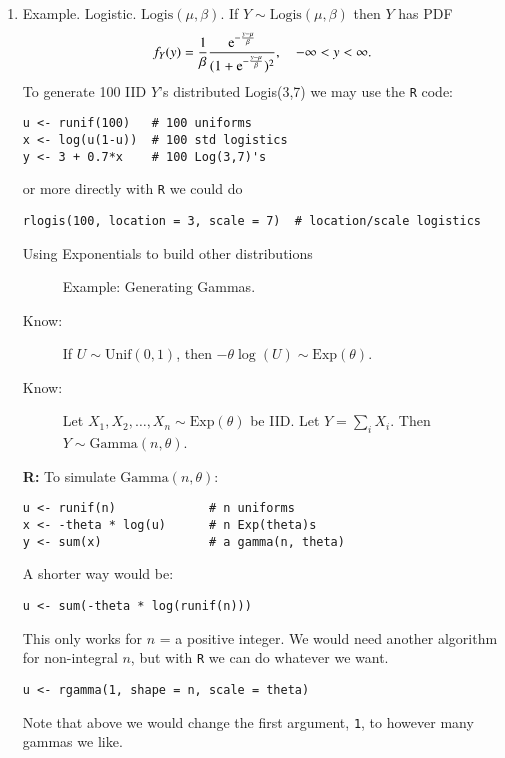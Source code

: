 \documentclass[11pt,english]{scrbook}
\begin{document}
\begin{enumerate}
\item Example. Logistic. \(\mathrm{Logis}(\mu,\beta)\).
\label{sec:orga914dd5}
If \(Y \sim \mathrm{Logis}(\mu,\beta)\) then \(Y\) has PDF
\[
f_{Y}(y)=\frac{1}{\beta}\frac{\mathrm{e}^{-\frac{y-\mu}{\beta}}}{(1 + \mathrm{e}^{-\frac{y-\mu}{\beta}})^{2}},\quad -\infty< y <\infty.
\]
To generate 100 IID \(Y\)'s distributed Logis(3,7) we may use the \texttt{R} code:

\begin{verbatim}
u <- runif(100)   # 100 uniforms
x <- log(u(1-u))  # 100 std logistics
y <- 3 + 0.7*x    # 100 Log(3,7)'s
\end{verbatim}

or more directly with \texttt{R} we could do
\begin{verbatim}
rlogis(100, location = 3, scale = 7)  # location/scale logistics
\end{verbatim}

\begin{description}
\item[{Using Exponentials to build other distributions}] Example: Generating Gammas.

\item[{Know:}] If \(U \sim\mathrm{Unif}(0,1)\), then \(-\theta\log(U)\sim\mathrm{Exp}(\theta)\).

\item[{Know:}] Let \(X_{1},X_{2},\ldots,X_{n}\sim\mathrm{Exp}(\theta)\) be IID.  Let \(Y=\sum_{i}X_{i}\). Then \(Y\sim\mathrm{Gamma}(n,\theta)\).
\end{description}

\textbf{R:} To simulate \(\mathrm{Gamma}(n,\theta)\):
\begin{verbatim}
u <- runif(n)             # n uniforms
x <- -theta * log(u)      # n Exp(theta)s
y <- sum(x)               # a gamma(n, theta)  
\end{verbatim}

A shorter way would be:
\begin{verbatim}
u <- sum(-theta * log(runif(n)))
\end{verbatim}

This only works for \(n\) = a positive integer. We would need another algorithm for non-integral \(n\), but with \texttt{R} we can do whatever we want.
\begin{verbatim}
u <- rgamma(1, shape = n, scale = theta)
\end{verbatim}

Note that above we would change the first argument, \texttt{1}, to however many gammas we like.



\end{enumerate}
\end{document}
